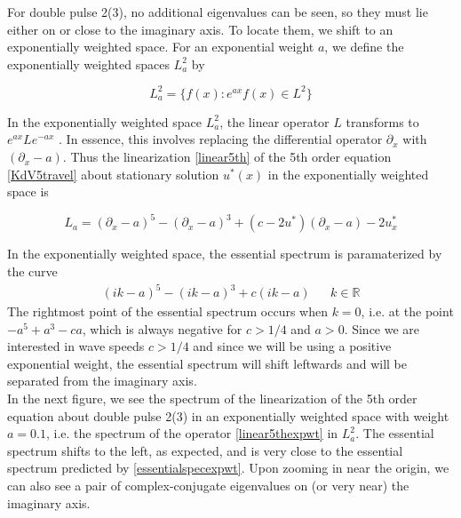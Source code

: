 \documentclass[12pt]{article}
\def\R{{\mathbb R}}
\begin{document}
For double pulse 2(3), no additional eigenvalues can be seen, so they must lie either on or close to the imaginary axis. To locate them, we shift to an exponentially weighted space. For an exponential weight $a$, we define the exponentially weighted spaces $L^2_a$ by

\begin{equation}\label{expweightedspace}
L^2_a = \{ f(x) : e^{ax} f(x) \in L^2\}
\end{equation}

In the exponentially weighted space $L^2_a$, the linear operator $L$ transforms to $e^{ax} L e^{-ax}$ \cite{Kapitula2013}. In essence, this involves replacing the differential operator $\partial_x$ with $(\partial_x - a)$. Thus the linearization \eqref{linear5th} of the 5th order equation \eqref{KdV5travel} about stationary solution $u^*(x)$ in the exponentially weighted space is

\begin{equation}\label{linear5thexpwt}
L_a = (\partial_x - a)^5 - (\partial_x - a)^3 + (c - 2 u^*)(\partial_x - a) - 2 u^*_x
\end{equation}

In the exponentially weighted space, the essential spectrum is paramaterized by the curve
\begin{align}\label{essentialspecexpwt}
(i k - a)^5 - (i k - a)^3 + c(i k - a) && k \in \R
\end{align}
The rightmost point of the essential spectrum occurs when $k = 0$, i.e. at the point $-a^5 + a^3 - c a$, which is always negative for $c > 1/4$ and $a > 0$. Since we are interested in wave speeds $c > 1/4$ and since we will be using a positive exponential weight, the essential spectrum will shift leftwards and will be separated from the imaginary axis.\\

In the next figure, we see the spectrum of the linearization of the 5th order equation about double pulse 2(3) in an exponentially weighted space with weight $a = 0.1$, i.e. the spectrum of the operator \eqref{linear5thexpwt} in $L^2_a$. The essential spectrum shifts to the left, as expected, and is very close to the essential spectrum predicted by \eqref{essentialspecexpwt}. Upon zooming in near the origin, we can also see a pair of complex-conjugate eigenvalues on (or very near) the imaginary axis.
\end{document}
